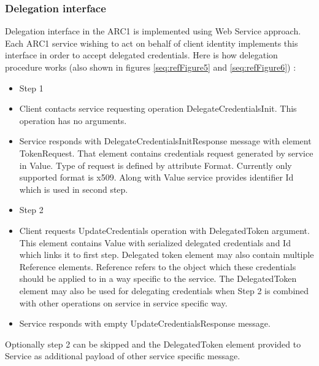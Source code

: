 \documentclass{article}
\newcommand\liststyleWWviiiNumix{%
\renewcommand\labelitemi{[F0B7?]}
\renewcommand\labelitemii{{}-}
\renewcommand\labelitemiii{${\blacksquare}$}
\renewcommand\labelitemiv{[F06C?]}
}
\newcommand\liststyleWWviiiNumx{%
\renewcommand\labelitemi{[F0B7?]}
\renewcommand\labelitemii{[F081?]}
\renewcommand\labelitemiii{${\blacksquare}$}
\renewcommand\labelitemiv{[F06C?]}
}
\newcounter{Figure}
\begin{document}
\subsubsection[Delegation interface]{Delegation interface}
\label{bkm:Ref204009766}{\upshape\color{black}
Delegation interface in the ARC1 is implemented using Web Service
approach. Each ARC1 service wishing to act on behalf of client identity
implements this interface in order to accept delegated credentials.
Here is how delegation procedure works (also shown in figures
\ref{seq:refFigure5} and \ref{seq:refFigure6}) :}

\liststyleWWviiiNumix
\begin{itemize}
\item {\color{black}
Step 1}
\item {\color{black}
Client contacts service requesting operation DelegateCredentialsInit.
This operation has no arguments.}
\item {\color{black}
Service responds with DelegateCredentialsInitResponse message with
element TokenRequest. That element contains credentials request
generated by service in Value. Type of request is defined by attribute
Format. Currently only supported format is x509. Along with Value
service provides identifier Id which is used in second step.}
\end{itemize}
\liststyleWWviiiNumx
\begin{itemize}
\item {\color{black}
Step 2}
\item {\color{black}
Client requests UpdateCredentials operation with DelegatedToken
argument. This element contains Value with serialized delegated
credentials and Id which links it to first step. Delegated token
element may also contain multiple Reference elements. Reference refers
to the object which these credentials should be applied to in a way
specific to the service. The DelegatedToken element may also be used
for delegating credentials when Step 2 is combined with other
operations on service in service specific way.}
\item {\color{black}
Service responds with empty UpdateCredentialsResponse message.}
\end{itemize}
{\color{black}
Optionally step 2 can be skipped and the DelegatedToken element provided
to Service as additional payload of other service specific message. }
\end{document}

